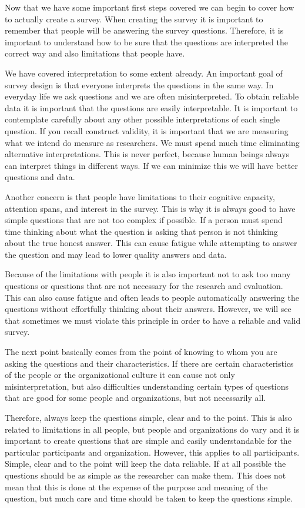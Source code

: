 \documentclass[]{book}
\theoremstyle{definition}
\theoremstyle{definition}
\theoremstyle{definition}
\theoremstyle{remark}
\begin{document}
Now that we have some important first steps covered we can begin to
cover how to actually create a survey. When creating the survey it is
important to remember that people will be answering the survey
questions. Therefore, it is important to understand how to be sure that
the questions are interpreted the correct way and also limitations that
people have.

We have covered interpretation to some extent already. An important goal
of survey design is that everyone interprets the questions in the same
way. In everyday life we ask questions and we are often misinterpreted.
To obtain reliable data it is important that the questions are easily
interpretable. It is important to contemplate carefully about any other
possible interpretations of each single question. If you recall
construct validity, it is important that we are measuring what we intend
do measure as researchers. We must spend much time eliminating
alternative interpretations. This is never perfect, because human beings
always can interpret things in different ways. If we can minimize this
we will have better questions and data.

Another concern is that people have limitations to their cognitive
capacity, attention spans, and interest in the survey. This is why it is
always good to have simple questions that are not too complex if
possible. If a person must spend time thinking about what the question
is asking that person is not thinking about the true honest answer. This
can cause fatigue while attempting to answer the question and may lead
to lower quality answers and data.

Because of the limitations with people it is also important not to ask
too many questions or questions that are not necessary for the research
and evaluation. This can also cause fatigue and often leads to people
automatically answering the questions without effortfully thinking about
their answers. However, we will see that sometimes we must violate this
principle in order to have a reliable and valid survey.

The next point basically comes from the point of knowing to whom you are
asking the questions and their characteristics. If there are certain
characteristics of the people or the organizational culture it can cause
not only misinterpretation, but also difficulties understanding certain
types of questions that are good for some people and organizations, but
not necessarily all.

Therefore, always keep the questions simple, clear and to the point.
This is also related to limitations in all people, but people and
organizations do vary and it is important to create questions that are
simple and easily understandable for the particular participants and
organization. However, this applies to all participants. Simple, clear
and to the point will keep the data reliable. If at all possible the
questions should be as simple as the researcher can make them. This does
not mean that this is done at the expense of the purpose and meaning of
the question, but much care and time should be taken to keep the
questions simple.
\end{document}
